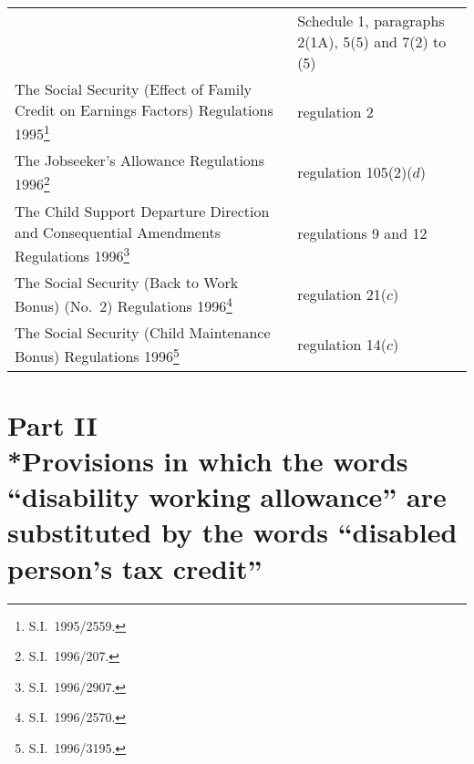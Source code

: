 \documentclass[12pt,a4paper]{article}
\begin{document}
\begin{longtable}{p{234.78296pt}p{131.2158pt}}
	&Schedule 1, paragraphs 2(1A), 5(5) and 7(2) to (5)\\
The Social Security (Effect of Family Credit on Earnings Factors) Regulations 1995\footnote{S.I.\ 1995/2559.}	&regulation 2\\
The Jobseeker’s Allowance Regulations 1996\footnote{S.I.\ 1996/207.}	&regulation 105(2)($d$) \\
The Child Support Departure Direction and Consequential Amendments Regulations 1996\footnote{S.I.\ 1996/2907.}	&regulations 9 and 12\\
The Social Security (Back to Work Bonus) (No.\ 2) Regulations 1996\footnote{S.I.\ 1996/2570.}	&regulation 21($c$) \\
The Social Security (Child Maintenance Bonus) Regulations 1996\footnote{S.I.\ 1996/3195.}	&regulation 14($c$) \\
\end{longtable}

\section[Part II --- Provisions in which the words “disability working allowance” are substituted by the words “disabled person's tax credit”]{Part II\\*Provisions in which the words “disability working allowance” are substituted by the words “disabled person's tax credit”}

\renewcommand\parthead{--- Schedule 2 Part II}
\end{document}
